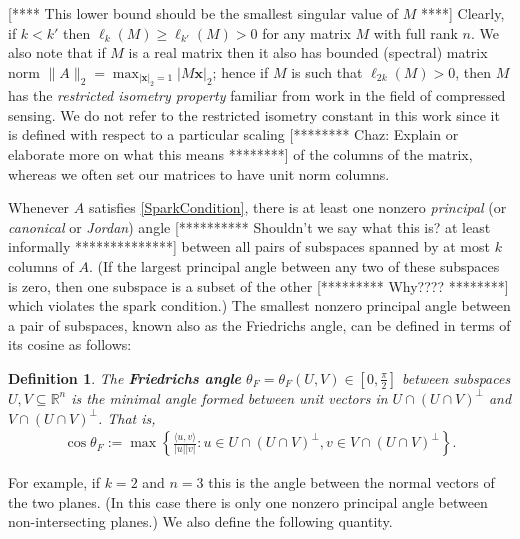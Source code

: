 \documentclass[journal, onecolumn]{IEEEtran}
\newtheorem{definition}{Definition}
\begin{document}
[**** This lower bound should be the smallest singular value of $M$ ****]
Clearly, if $k < k'$ then $\ell_{k}(M) \geq \ell_{k'}(M) > 0$ for any matrix $M$ with full rank $n$. We also note that if $M$ is a real matrix then it also has bounded (spectral) matrix norm $\|A\|_2 = \max_{|\mathbf{x}|_2 = 1}|M\mathbf{x}|_2$; hence if $M$ is such that $\ell_{2k}(M) > 0$, then $M$ has the \emph{restricted isometry property} \cite{CandesTao05} familiar from work in the field of compressed sensing. We do not refer to the restricted isometry constant in this work since it is defined with respect to a particular scaling [******** Chaz:  Explain or elaborate more on what this means ********] of the columns of the matrix, whereas we often set our matrices to have unit norm columns.

Whenever $A$ satisfies \eqref{SparkCondition}, there is at least one nonzero \textit{principal} (or \textit{canonical} or \textit{Jordan}) angle [********** Shouldn't we say what this is? at least informally **************] between all pairs of subspaces spanned by at most $k$ columns of $A$. (If the largest principal angle between any two of these subspaces is zero, then one subspace is a subset of the other [*********  Why???? ********] which violates the spark condition.) The smallest nonzero principal angle between a pair of subspaces, known also as the Friedrichs angle, can be defined in terms of its cosine as follows:

\begin{definition}\label{FriedrichsDefinition}
The \textbf{Friedrichs angle} $\theta_F = \theta_F(U,V) \in [0,\frac{\pi}{2}]$ between subspaces $U,V \subseteq \mathbb{R}^n$ is the minimal angle formed between unit vectors in $U \cap (U \cap V)^\perp$ and $V \cap (U \cap V)^\perp$. That is,
\begin{align}
\cos{\theta_F} := \max\left\{ \frac{ \langle u, v \rangle }{|u||v|}: u \in U \cap (U \cap V)^\perp, v \in V \cap (U \cap V)^\perp \right\}.
\end{align}
\end{definition}

For example, if $k=2$ and $n=3$ this is the angle between the normal vectors of the two planes. (In this case there is only one nonzero principal angle between non-intersecting planes.) We also define the following quantity.
\end{document}
